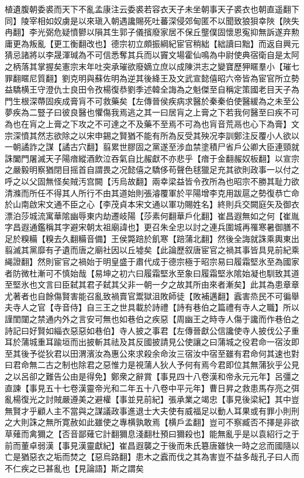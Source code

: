 植遺腹朝委裘而天下不亂孟康注云委裘若容衣天子未坐朝事天子裘衣也朝直遥翻下同】陵宰相如奴虜是以來瑱入朝遇讒賜死吐蕃深侵郊甸匿不以聞致狼狽幸陜【陜失冉翻】李光弼危疑憤鬰以隕其生郭子儀擯廢家居不保丘壟僕固懷恩寃抑無訴遂弃勲庸更為叛亂【更工衡翻改也】德宗初立頗振綱紀宦官稍絀【絀讀曰黜】而返自興元猜忌諸將以李晟渾瑊為不可信悉奪其兵而以竇文場霍仙鳴為中尉使典宿衛自是太阿之柄落其掌握矣憲宗末年吐突承璀欲廢嫡立庶以成陳洪志之變寶歷狎䁥羣小【璀七罪翻䁥尼質翻】劉克明與蘇佐明為逆其後絳王及文武宣懿僖昭六帝皆為宦官所立勢益驕横王守澄仇士良田令孜楊復恭劉季述韓全誨為之魁傑至自稱定策國老目天子為門生根深蔕固疾成膏肓不可救藥矣【左傳晉侯疾病求醫於秦秦伯使醫緩為之未至公夢疾為二豎子曰彼良醫也懼傷我焉逃之其一曰居肓之上膏之下若我何醫至曰疾不可為也在肓之上膏之下攻之不可達之不及藥不至焉不可為也肓音荒鬲也心下為膏】文宗深憤其然志欲除之以宋申錫之賢猶不能有所為反受其殃况李訓鄭注反覆小人欲以一朝譎詐之謀【譎古穴翻】翦累世膠固之黨遂至涉血禁塗積尸省戶公卿大臣連頸就誅闔門屠滅天子陽瘖縱酒飲泣吞氣自比赧獻不亦悲乎【瘖于金翻赧奴板翻】以宣宗之嚴毅明察猶閉目摇首自謂畏之况懿僖之驕侈苟聲色毬獵足充其欲則政事一以付之呼之以父固無怪矣賊汚宫闕【汚烏故翻】兩幸梁益皆令孜所為也昭宗不勝其耻力欲清滌而所任不得其人所行不由其道始則張濬覆軍於平陽增李克用跋扈之勢復恭亡命於山南啟宋文通不臣之心【李茂貞本宋文通以軍功賜姓名】終則兵交闕庭矢及御衣漂泊莎城流寓華隂幽辱東内劫遷岐陽【莎素何翻華戶化翻】崔昌遐無如之何【崔胤字昌遐通鑑稱其字避宋朝太祖廟諱也】更召朱全忠以討之連兵圍城再罹寒暑御膳不足於糗糒【糗去久翻糒音備】王侯斃踣於飢寒【踣蒲北翻】然後全誨就誅乘輿東出翦滅其黨靡有孑遺而唐之廟社因以丘墟矣【此論歷叙唐宦官之禍其事皆具見前紀乘䋲證翻】然則宦官之禍始于明皇盛于肅代成于德宗極于昭宗易曰履霜堅氷至為國家者防微杜漸可不慎始哉【易坤之初六曰履霜堅氷至象曰履霜堅氷隂始凝也馴致其道至堅氷也文言曰臣弑其君子弑其父非一朝一夕之故其所由來者漸矣】此其為患章章尤著者也自餘傷賢害能召亂致禍賣官鬻獄沮敗師徒【敗補邁翻】蠧害烝民不可徧舉夫寺人之官【寺音侍】自三王之世具載於詩禮【詩有巷伯之篇禮有寺人之職】所以謹閨闥之禁通内外之言安可無也如巷伯之疾惡【周幽王之時寺人傷于讒而作巷伯之詩記曰好賢如緇衣惡惡如巷伯】寺人披之事君【左傳晉獻公信讒使寺人披伐公子重耳於蒲城重耳踰垣而出披斬其祛及其反國披請見公使讓之曰蒲城之役君命一宿汝即至其後予從狄君以田渭濱汝為惠公來求殺余命汝三宿汝中宿至雖有君命何其速也對曰君命無二古之制也除君之惡惟力是視蒲人狄人予何有焉今君即位其無蒲狄乎公見之以呂卻之難告公由是得免】鄭衆之辭賞【事見四十八卷漢和帝永元元年】呂彊之直諫【事見五十七卷漢靈帝光和二年五十八卷中平元年】曹日昇之救患馬存亮之弭亂楊復光之討賊嚴遵美之避權【事並見前紀】張承業之竭忠【事見後梁紀】其中豈無賢才乎顧人主不當與之謀議政事進退士大夫使有威福足以動人耳果或有罪小則刑之大則誅之無所寛赦如此雖使之專横孰敢焉【横戶孟翻】豈可不察臧否不擇是非欲草薙而禽獮之【否音鄙薙它計翻獮息淺翻杜預曰獮殺也】能無亂乎是以袁紹行之于前而董卓弱漢【事見漢靈獻紀】崔昌遐襲之于後而朱氏簒唐雖快一時之忿而國隨以亡是猶惡衣之垢而焚之【惡烏路翻】患木之蠧而伐之其為害豈不益多哉孔子曰人而不仁疾之已甚亂也【見論語】斯之謂矣

